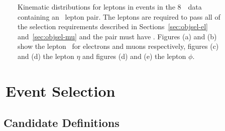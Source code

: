 \begin{figure}[h]
{        }
    \caption[Lepton kinematic distributions for \dilep\ events in the 8~\tev\
    data. ]
    {\small Kinematic distributions for leptons in events in the 8~\tev\
    data containing an \ossf\ lepton pair. The leptons are required to pass all of the selection
    requirements described in Sections~\ref{sec:objsel-el}
    and~\ref{sec:objsel-mu} and the pair must have \sstooos. 
    Figures (a) and (b) show the lepton \pt\ for electrons and muons
    respectively, figures (c) and (d) the lepton $\eta$ and figures (d) and (e)
    the lepton $\phi$.    }
\label{fig:dilep-lepkin-eight}
\end{figure}


\section{\ZZ\ Event Selection}
\label{sec:eventsel}

\subsection{\Z\ Candidate Definitions}
\label{sec:eventsel-definitions}

